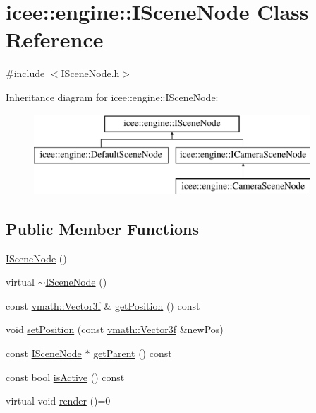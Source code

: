 \hypertarget{classicee_1_1engine_1_1ISceneNode}{
\section{icee::engine::ISceneNode Class Reference}
\label{classicee_1_1engine_1_1ISceneNode}
}


{\ttfamily \#include $<$ISceneNode.h$>$}

Inheritance diagram for icee::engine::ISceneNode:\begin{figure}[H]
\begin{center}
\leavevmode
\includegraphics[height=3.000000cm]{classicee_1_1engine_1_1ISceneNode}
\end{center}
\end{figure}
\subsection*{Public Member Functions}
\begin{DoxyCompactItemize}
\item 
\hyperlink{classicee_1_1engine_1_1ISceneNode_a1a32b1c88daaa734b44e179e6685f725}{ISceneNode} ()
\item 
virtual \hyperlink{classicee_1_1engine_1_1ISceneNode_af0d0996364a4584550a882fe2e07d9e9}{$\sim$ISceneNode} ()
\item 
const \hyperlink{classvmath_1_1Vector3f}{vmath::Vector3f} \& \hyperlink{classicee_1_1engine_1_1ISceneNode_a257d4106f3e33aa74fcee8324296052d}{getPosition} () const 
\item 
void \hyperlink{classicee_1_1engine_1_1ISceneNode_a077bc5f74cea7bb0f799af977cb6361b}{setPosition} (const \hyperlink{classvmath_1_1Vector3f}{vmath::Vector3f} \&newPos)
\item 
const \hyperlink{classicee_1_1engine_1_1ISceneNode}{ISceneNode} $\ast$ \hyperlink{classicee_1_1engine_1_1ISceneNode_a8b50dcdb52ff0175fa5abf856ee8308e}{getParent} () const 
\item 
const bool \hyperlink{classicee_1_1engine_1_1ISceneNode_a07575cfd84c5dd0de037847396ad02d3}{isActive} () const 
\item 
virtual void \hyperlink{classicee_1_1engine_1_1ISceneNode_a2951ecb91b29bcc74d992de4880daa0f}{render} ()=0
\end{DoxyCompactItemize}
